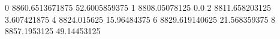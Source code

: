 0 8860.6513671875 52.6005859375
1 8808.05078125 0.0
2 8811.658203125 3.607421875
4 8824.015625 15.96484375
6 8829.619140625 21.568359375
8 8857.1953125 49.14453125

